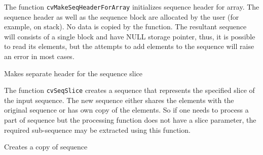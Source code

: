 The function \texttt{cvMakeSeqHeaderForArray} initializes sequence
header for array. The sequence header as well as the sequence block are
allocated by the user (for example, on stack). No data is copied by the
function. The resultant sequence will consists of a single block and
have NULL storage pointer, thus, it is possible to read its elements,
but the attempts to add elements to the sequence will raise an error in
most cases.

\label{SeqSlice}

Makes separate header for the sequence slice


\begin{description}
\end{description}

The function \texttt{cvSeqSlice} creates a sequence that represents the specified slice of the input sequence. The new sequence either shares the elements with the original sequence or has own copy of the elements. So if one needs to process a part of sequence but the processing function does not have a slice parameter, the required sub-sequence may be extracted using this function.


\label{CloneSeq}

Creates a copy of sequence


\begin{description}
\end{description}

